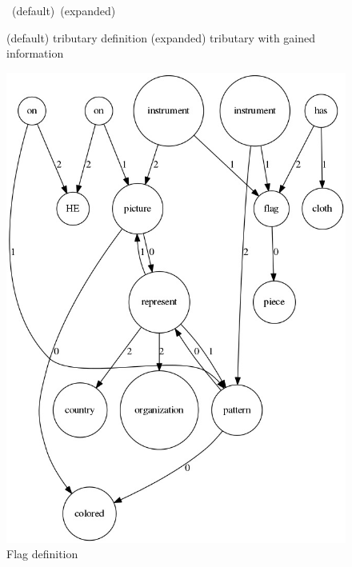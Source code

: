 \documentclass[twoside,b5paper,10pt]{article}
\begin{document}
\begin{figure}[htb]
{{    }
  }
  \vspace{3pt}
  \hbox{\hspace{0.13\columnwidth} (default) \hspace{0.3\columnwidth} (expanded)}
  \caption{ (default) tributary definition (expanded) tributary with gained information}
  \label{fig:tributary}
\end{figure}

\begin{figure}[htb]
  \centerline{\includegraphics[scale=0.3]{Figure/flag.jpg}}
  \caption{Flag definition}
  \label{fig:flag}
 \end{figure}
\end{document}
